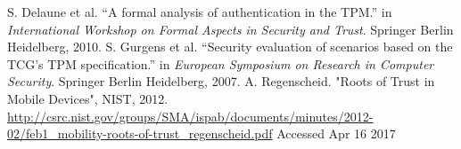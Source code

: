 \documentclass[12pt,lot, lof]{puthesis}
\begin{document}
\begin{flushleft}
\begin{footnotesize}
\begin{thebibliography}{\kern\bibindent}
    S. Delaune et al. ``A formal analysis of authentication in the TPM.'' in \textit{International Workshop on Formal Aspects in Security and Trust}. Springer Berlin Heidelberg, 2010.
    S. Gurgens et al. ``Security evaluation of scenarios based on the TCG’s TPM specification.'' in \textit{European Symposium on Research in Computer Security}. Springer Berlin Heidelberg, 2007.
    A. Regenscheid. "Roots of Trust in Mobile Devices", NIST, 2012. \url{http://csrc.nist.gov/groups/SMA/ispab/documents/minutes/2012-02/feb1\_mobility-roots-of-trust\_regenscheid.pdf} Accessed Apr 16 2017
\end{thebibliography}
\end{footnotesize}
\end{flushleft}
\end{document}
